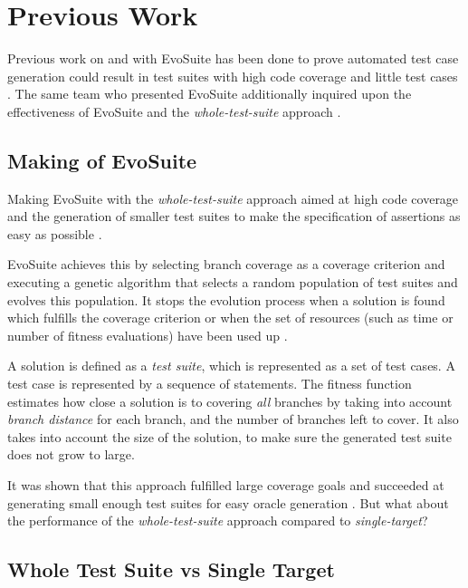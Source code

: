 \section{Previous Work} \label{work}

Previous work on and with EvoSuite has been done to prove automated test case generation could result in test suites with high code coverage and little test cases \cite{FRASER2013}.
The same team who presented EvoSuite additionally inquired upon the effectiveness of EvoSuite and the \textit{whole-test-suite} approach \cite{FRASER2014}. 

\subsection{Making of EvoSuite}

Making EvoSuite with the \textit{whole-test-suite} approach aimed at high code coverage and the generation of smaller test suites to make the specification of assertions as easy as possible \cite{FRASER2013}.

EvoSuite achieves this by selecting branch coverage as a coverage criterion and executing a genetic algorithm that selects a random population of test suites and evolves this population.
It stops the evolution process when a solution is found which fulfills the coverage criterion or when the set of resources (such as time or number of fitness evaluations) have been used up \cite{FRASER2013}. 

A solution is defined as a \textit{test suite}, which is represented as a set of test cases. 
A test case is represented by a sequence of statements. 
The fitness function estimates how close a solution is to covering \textit{all} branches by taking into account \textit{branch distance} for each branch, and the number of branches left to cover. 
It also takes into account the size of the solution, to make sure the generated test suite does not grow to large. 

It was shown that this approach fulfilled large coverage goals and succeeded at generating small enough test suites for easy oracle generation \cite{FRASER2013}. 
But what about the performance of the \textit{whole-test-suite} approach compared to \textit{single-target}?

\subsection{Whole Test Suite vs Single Target}

